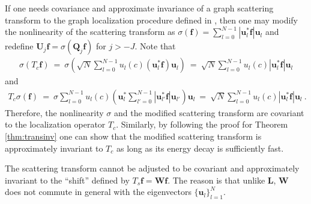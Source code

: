\documentclass{article}
\def\BL{\boldsymbol{L}}
\def\BQ{\boldsymbol{Q}}
\def\BU{\boldsymbol{U}}
\def\BW{\boldsymbol{W}}
\def\Bf{\boldsymbol{f}}
\def\Bu{\boldsymbol{u}}
\newcommand{\abs}[1]{\left| #1 \right|}
\begin{document}
If one needs covariance and approximate invariance of a graph scattering transform to the {graph localization procedure} defined in \cite{ShuRV16}, then one may modify the nonlinearity of the scattering transform as $\sigma(\Bf) = \sum_{l=0}^{N-1} \abs{\Bu_l^* \Bf} \Bu_l$ and redefine $\BU_j \Bf = \sigma(\BQ_j \Bf)$ for $j > -J$. Note that
\begin{equation}
\begin{aligned}
\sigma(T_c \Bf) ~=~  \sigma \left( \sqrt{N} \sum_{l=0}^{N-1} u_l(c) (\Bu_l^* \Bf) \Bu_l \right)
~=~  \sqrt{N} \sum_{l=0}^{N-1} u_l(c) \abs{\Bu_l^* \Bf} \Bu_l
\end{aligned}
\end{equation}
and
\begin{equation}
\begin{aligned}
T_c \sigma(\Bf) ~=~  \sigma \sum_{l=0}^{N-1} u_l(c) \left( \Bu_l^* \sum_{l'=0}^{N-1}  \abs{\Bu_{l'}^* \Bf} \Bu_{l'} \right) \Bu_l
~=~  \sqrt{N} \sum_{l=0}^{N-1} u_l(c) \abs{\Bu_l^* \Bf} \Bu_l ~.
\end{aligned}
\end{equation}
Therefore, the nonlinearity $\sigma$ and the modified scattering transform are covariant to the {localization operator} $T_c$. Similarly, by following the proof for Theorem \ref{thm:transinv} one can show that the modified scattering transform is approximately invariant to {$T_c$} as long as its energy decay is sufficiently fast.

The scattering transform cannot be adjusted to be covariant and approximately invariant to the ``shift'' defined by $T_s \Bf =  \BW \Bf$. The reason is that unlike $\BL$, $\BW$ does not commute in general with the eigenvectors $\{\Bu_l\}_{l=1}^N$. 
\end{document}
